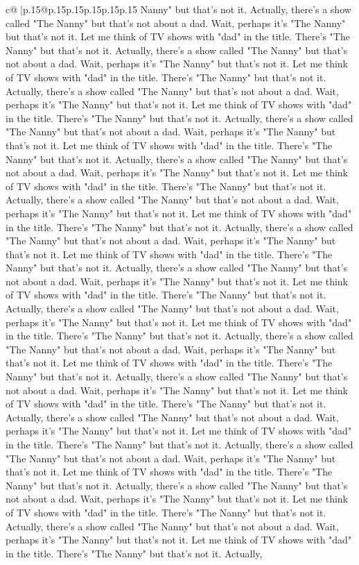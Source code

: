 \documentclass{article}
\begin{document}
{\begin{supertabular}{c@{$\;$}|p{.15\linewidth}@{}p{.15\linewidth}p{.15\linewidth}p{.15\linewidth}p{.15\linewidth}p{.15\linewidth}}
{{{Nanny" but that's not it. Actually, there's a show called "The Nanny" but that's not about a dad. Wait, perhaps it's "The Nanny" but that's not it. Let me think of TV shows with "dad" in the title. There's "The Nanny" but that's not it. Actually, there's a show called "The Nanny" but that's not about a dad. Wait, perhaps it's "The Nanny" but that's not it. Let me think of TV shows with "dad" in the title. There's "The Nanny" but that's not it. Actually, there's a show called "The Nanny" but that's not about a dad. Wait, perhaps it's "The Nanny" but that's not it. Let me think of TV shows with "dad" in the title. There's "The Nanny" but that's not it. Actually, there's a show called "The Nanny" but that's not about a dad. Wait, perhaps it's "The Nanny" but that's not it. Let me think of TV shows with "dad" in the title. There's "The Nanny" but that's not it. Actually, there's a show called "The Nanny" but that's not about a dad. Wait, perhaps it's "The Nanny" but that's not it. Let me think of TV shows with "dad" in the title. There's "The Nanny" but that's not it. Actually, there's a show called "The Nanny" but that's not about a dad. Wait, perhaps it's "The Nanny" but that's not it. Let me think of TV shows with "dad" in the title. There's "The Nanny" but that's not it. Actually, there's a show called "The Nanny" but that's not about a dad. Wait, perhaps it's "The Nanny" but that's not it. Let me think of TV shows with "dad" in the title. There's "The Nanny" but that's not it. Actually, there's a show called "The Nanny" but that's not about a dad. Wait, perhaps it's "The Nanny" but that's not it. Let me think of TV shows with "dad" in the title. There's "The Nanny" but that's not it. Actually, there's a show called "The Nanny" but that's not about a dad. Wait, perhaps it's "The Nanny" but that's not it. Let me think of TV shows with "dad" in the title. There's "The Nanny" but that's not it. Actually, there's a show called "The Nanny" but that's not about a dad. Wait, perhaps it's "The Nanny" but that's not it. Let me think of TV shows with "dad" in the title. There's "The Nanny" but that's not it. Actually, there's a show called "The Nanny" but that's not about a dad. Wait, perhaps it's "The Nanny" but that's not it. Let me think of TV shows with "dad" in the title. There's "The Nanny" but that's not it. Actually, there's a show called "The Nanny" but that's not about a dad. Wait, perhaps it's "The Nanny" but that's not it. Let me think of TV shows with "dad" in the title. There's "The Nanny" but that's not it. Actually, there's a show called "The Nanny" but that's not about a dad. Wait, perhaps it's "The Nanny" but that's not it. Let me think of TV shows with "dad" in the title. There's "The Nanny" but that's not it. Actually, there's a show called "The Nanny" but that's not about a dad. Wait, perhaps it's "The Nanny" but that's not it. Let me think of TV shows with "dad" in the title. There's "The Nanny" but that's not it. Actually, there's a show called "The Nanny" but that's not about a dad. Wait, perhaps it's "The Nanny" but that's not it. Let me think of TV shows with "dad" in the title. There's "The Nanny" but that's not it. Actually, }}}
\end{supertabular}}
\end{document}
